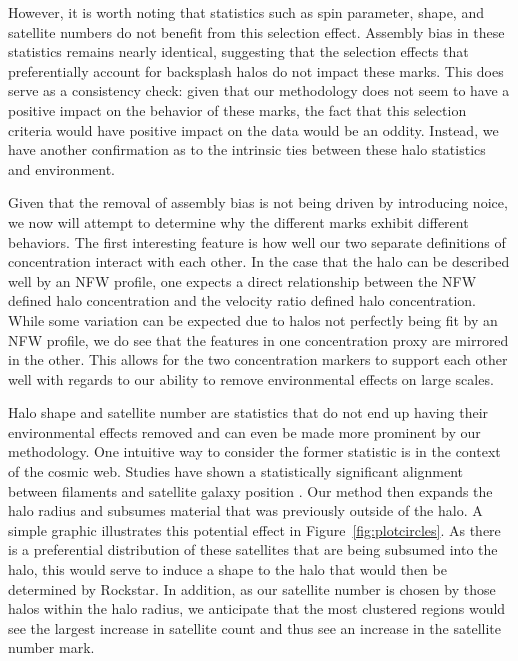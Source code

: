 \documentclass[usenatbib,usegraphicx,letterpaper]{mn2e}
\begin{document}
However, it is worth noting that statistics such as spin parameter, shape, and satellite numbers do not benefit from this selection effect. Assembly bias in these statistics remains nearly identical, suggesting that the selection effects that preferentially account for backsplash halos do not impact these marks. This does serve as a consistency check: given that our methodology does not seem to have a positive impact on the behavior of these marks, the fact that this selection criteria would have positive impact on the data would be an oddity. Instead, we have another confirmation as to the intrinsic ties between these halo statistics and environment.

Given that the removal of assembly bias is not being driven by introducing noice, we now will attempt to determine why the different marks exhibit different behaviors. The first interesting feature is how well our two separate definitions of concentration interact with each other. In the case that the halo can be described well by an NFW profile, one expects a direct relationship between the NFW defined halo concentration and the velocity ratio defined halo concentration. While some variation can be expected due to halos not perfectly being fit by an NFW profile, we do see that the features in one concentration proxy are mirrored in the other. This allows for the two concentration markers to support each other well with regards to our ability to remove environmental effects on large scales.

Halo shape and satellite number are statistics that do not end up having their environmental effects removed and can even be made more prominent by our methodology. One intuitive way to consider the former statistic is in the context of the cosmic web. Studies have shown a statistically significant alignment between filaments and satellite galaxy position \citep{tempel15, velliscig15}. Our method then expands the halo radius and subsumes material that was previously outside of the halo. A simple graphic illustrates this potential effect in Figure~\ref{fig:plotcircles}. As there is a preferential distribution of these satellites that are being subsumed into the halo, this would serve to induce a shape to the halo that would then be determined by Rockstar. In addition, as our satellite number is chosen by those halos within the halo radius, we anticipate that the most clustered regions would see the largest increase in satellite count and thus see an increase in the satellite number mark.
\end{document}
